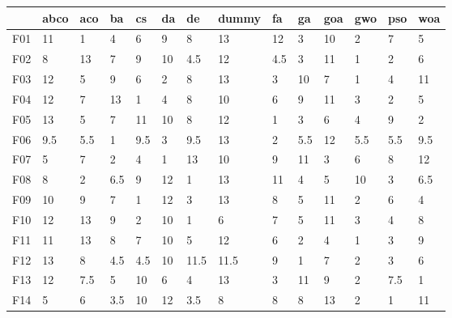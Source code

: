\begin{table}
    \begin{adjustbox}{width=\linewidth}
        \begin{tabular}{llllllllllllll}
            \toprule
            {}   & abco  & aco   & ba    & cs    & da    & de    & dummy  & fa    & ga    & goa   & gwo   & pso   & woa   \\
            \midrule
            F01  & 11    & 1     & 4     & 6     & 9     & 8     & 13     & 12    & 3     & 10    & 2     & 7     & 5     \\
            F02  & 8     & 13    & 7     & 9     & 10    & 4.5   & 12     & 4.5   & 3     & 11    & 1     & 2     & 6     \\
            F03  & 12    & 5     & 9     & 6     & 2     & 8     & 13     & 3     & 10    & 7     & 1     & 4     & 11    \\
            F04  & 12    & 7     & 13    & 1     & 4     & 8     & 10     & 6     & 9     & 11    & 3     & 2     & 5     \\
            F05  & 13    & 5     & 7     & 11    & 10    & 8     & 12     & 1     & 3     & 6     & 4     & 9     & 2     \\
            F06  & 9.5   & 5.5   & 1     & 9.5   & 3     & 9.5   & 13     & 2     & 5.5   & 12    & 5.5   & 5.5   & 9.5   \\
            F07  & 5     & 7     & 2     & 4     & 1     & 13    & 10     & 9     & 11    & 3     & 6     & 8     & 12    \\
            F08  & 8     & 2     & 6.5   & 9     & 12    & 1     & 13     & 11    & 4     & 5     & 10    & 3     & 6.5   \\
            F09  & 10    & 9     & 7     & 1     & 12    & 3     & 13     & 8     & 5     & 11    & 2     & 6     & 4     \\
            F10  & 12    & 13    & 9     & 2     & 10    & 1     & 6      & 7     & 5     & 11    & 3     & 4     & 8     \\
            F11  & 11    & 13    & 8     & 7     & 10    & 5     & 12     & 6     & 2     & 4     & 1     & 3     & 9     \\
            F12  & 13    & 8     & 4.5   & 4.5   & 10    & 11.5  & 11.5   & 9     & 1     & 7     & 2     & 3     & 6     \\
            F13  & 12    & 7.5   & 5     & 10    & 6     & 4     & 13     & 3     & 11    & 9     & 2     & 7.5   & 1     \\
            F14  & 5     & 6     & 3.5   & 10    & 12    & 3.5   & 8      & 8     & 8     & 13    & 2     & 1     & 11    \\

\end{tabular}
\end{adjustbox}
\end{table}
